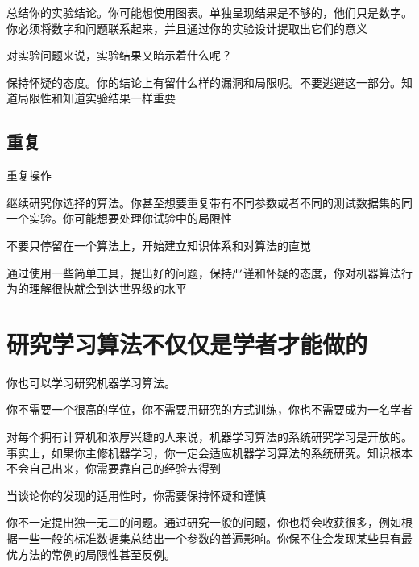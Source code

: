 总结你的实验结论。你可能想使用图表。单独呈现结果是不够的，他们只是数字。你必须将数字和问题联系起来，并且通过你的实验设计提取出它们的意义

对实验问题来说，实验结果又暗示着什么呢？

保持怀疑的态度。你的结论上有留什么样的漏洞和局限呢。不要逃避这一部分。知道局限性和知道实验结果一样重要
\subsection{重复}
重复操作

继续研究你选择的算法。你甚至想要重复带有不同参数或者不同的测试数据集的同一个实验。你可能想要处理你试验中的局限性

不要只停留在一个算法上，开始建立知识体系和对算法的直觉

通过使用一些简单工具，提出好的问题，保持严谨和怀疑的态度，你对机器算法行为的理解很快就会到达世界级的水平
\section{研究学习算法不仅仅是学者才能做的}
你也可以学习研究机器学习算法。

你不需要一个很高的学位，你不需要用研究的方式训练，你也不需要成为一名学者

对每个拥有计算机和浓厚兴趣的人来说，机器学习算法的系统研究学习是开放的。事实上，如果你主修机器学习，你一定会适应机器学习算法的系统研究。知识根本不会自己出来，你需要靠自己的经验去得到

当谈论你的发现的适用性时，你需要保持怀疑和谨慎

你不一定提出独一无二的问题。通过研究一般的问题，你也将会收获很多，例如根据一些一般的标准数据集总结出一个参数的普遍影响。你保不住会发现某些具有最优方法的常例的局限性甚至反例。